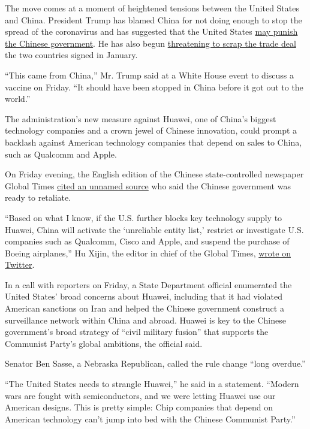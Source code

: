 The move comes at a moment of heightened tensions between the United
States and China. President Trump has blamed China for not doing enough
to stop the spread of the coronavirus and has suggested that the United
States
\href{https://www.nytimes3xbfgragh.onion/2020/05/01/us/politics/coronavirus-china-trump.html}{may
punish the Chinese government}. He has also begun
\href{https://www.nytimes3xbfgragh.onion/2020/05/08/business/us-china-trade-coronavirus.html}{threatening
to scrap the trade deal} the two countries signed in January.

``This came from China,'' Mr. Trump said at a White House event to
discuss a vaccine on Friday. ``It should have been stopped in China
before it got out to the world.''

The administration's new measure against Huawei, one of China's biggest
technology companies and a crown jewel of Chinese innovation, could
prompt a backlash against American technology companies that depend on
sales to China, such as Qualcomm and Apple.

On Friday evening, the English edition of the Chinese state-controlled
newspaper Global Times
\href{https://www.globaltimes.cn/content/1188491.shtml}{cited an unnamed
source} who said the Chinese government was ready to retaliate.

``Based on what I know, if the U.S. further blocks key technology supply
to Huawei, China will activate the `unreliable entity list,' restrict or
investigate U.S. companies such as Qualcomm, Cisco and Apple, and
suspend the purchase of Boeing airplanes,'' Hu Xijin, the editor in
chief of the Global Times,
\href{https://twitter.com/HuXijin_GT/status/1261250635371909120}{wrote
on Twitter}.

In a call with reporters on Friday, a State Department official
enumerated the United States' broad concerns about Huawei, including
that it had violated American sanctions on Iran and helped the Chinese
government construct a surveillance network within China and abroad.
Huawei is key to the Chinese government's broad strategy of ``civil
military fusion'' that supports the Communist Party's global ambitions,
the official said.

Senator Ben Sasse, a Nebraska Republican, called the rule change ``long
overdue.''

``The United States needs to strangle Huawei,'' he said in a statement.
``Modern wars are fought with semiconductors, and we were letting Huawei
use our American designs. This is pretty simple: Chip companies that
depend on American technology can't jump into bed with the Chinese
Communist Party.''

